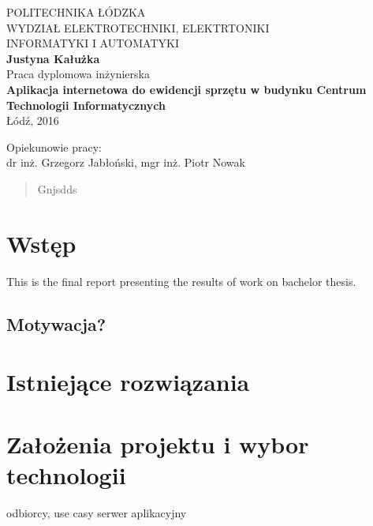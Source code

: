 \documentclass[a4paper,12pt,twoside]{article}
\begin{document}
\newpage
\begin{center}
POLITECHNIKA ŁÓDZKA\\
WYDZIAŁ ELEKTROTECHNIKI, ELEKTRTONIKI\\
INFORMATYKI I AUTOMATYKI\\
\vspace{1.5cm}
\textbf{Justyna Kałużka}\\
Praca dyplomowa inżynierska\\
\textbf{Aplikacja internetowa do ewidencji sprzętu w budynku Centrum Technologii Informatycznych}\\
Łódź, 2016
\end{center}
\hspace{1.15cm}Opiekunowie pracy:\\
\vspace{0.5cm}
\hspace{1cm} dr inż. Grzegorz Jabłoński, mgr inż. Piotr Nowak
\vspace{1.5cm}

\renewcommand{\abstractname}{Streszczenie}
\begin{abstract}
Gnjsdds
\end{abstract}



\newpage
\setcounter{page}{1}
\tableofcontents


\newpage
\section{Wstęp}

This is the final report presenting the results of work on bachelor thesis.

\subsection{Motywacja?}


\section{Istniejące rozwiązania}


\section{Założenia projektu i wybor technologii}
odbiorcy, use casy
serwer aplikacyjny
\end{document}
